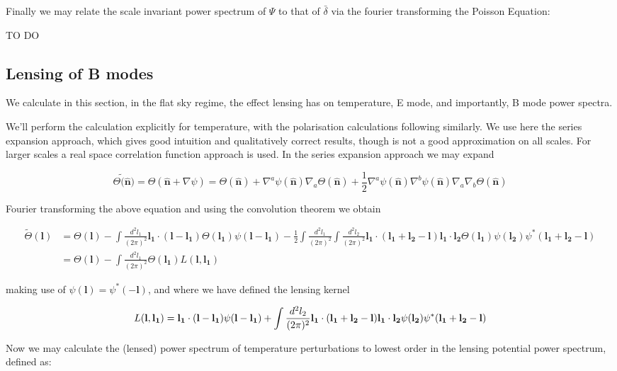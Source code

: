 \documentclass[a4paper,11pt]{article}
\renewcommand{\v}[1]{\mathbf{#1}}
\newcommand{\half}{\frac{1}{2}}
\newcommand{\finttwo}[1]{\int \frac{d^2 #1}{(2\pi)^2}}
\newcommand{\unit}[1]{\hat{\v{#1}}}
\begin{document}
Finally we may relate the scale invariant power spectrum of $\Psi$ to that of $\bar{\delta}$ via the fourier transforming the Poisson Equation:

TO DO

\subsection{Lensing of B modes} 

We calculate in this section, in the flat sky regime, the effect lensing has on temperature, E mode, and importantly, B mode power spectra. 

We'll perform the calculation explicitly for temperature, with the polarisation calculations following similarly. We use here the series expansion approach, which gives good intuition and qualitatively correct results, though is not a good approximation on all scales. For larger scales a real space correlation function approach is used. In the series expansion approach we may expand

\begin{equation}
\tilde{\Theta(\unit{n}}) = \Theta(\unit{n}+\nabla\psi) =\Theta(\unit{n})+\nabla^a\psi(\unit{n})\nabla_a\Theta(\unit{n})+\half\nabla^a\psi(\unit{n})\nabla^b\psi(\unit{n})\nabla_a\nabla_b\Theta(\unit{n})
\end{equation}

Fourier transforming the above equation and using the convolution theorem we obtain

\begin{align}
\tilde{\Theta}(\v{l}) &= \Theta(\v{l}) - \finttwo{l_1} \v{l_1}\cdot(\v{l}-\v{l_1})\Theta(\v{l_1})\psi(\v{l}-\v{l_1}) -\half \finttwo{l_1}\finttwo{l_2}\v{l_1}\cdot(\v{l_1}+\v{l_2}-\v{l})\v{l_1}\cdot\v{l_2}\Theta(\v{l_1})\psi(\v{l_2})\psi^*(\v{l_1}+\v{l_2}-\v{l})\\
&= \Theta(\v{l}) - \finttwo{l_1} \Theta(\v{l_1})L(\v{l},\v{l_1})
\label{lensedtemp}
\end{align}

making use of $\psi(\v{l})=\psi^*(-\v{l})$, and where we have defined the lensing kernel

\begin{equation}
L(\v{l},\v{l_1}) = \v{l_1}\cdot(\v{l}-\v{l_1})\psi(\v{l}-\v{l_1})+\finttwo{l_2}\v{l_1}\cdot(\v{l_1}+\v{l_2}-\v{l})\v{l_1}\cdot\v{l_2}\psi(\v{l_2})\psi^*(\v{l_1}+\v{l_2}-\v{l})\\
\end{equation}

Now we may calculate the (lensed) power spectrum of temperature perturbations to lowest order in the lensing potential power spectrum, defined as:
\end{document}
